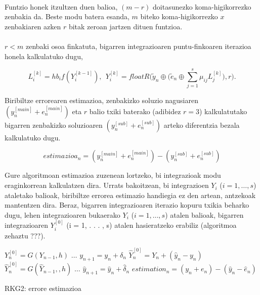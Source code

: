 \paragraph*{}Funtzio honek itzultzen duen balioa, $(m-r)$ doitasunezko koma-higikorrezko zenbakia da. Beste modu batera esanda, $m$ biteko koma-higikorrezko $x$ zenbakiaren azken $r$ bitak zeroan jartzen dituen funtzioa.
     
\paragraph*{} $r<m$ zenbaki osoa finkatuta, bigarren integrazioaren puntu-finkoaren iterazioa honela kalkulatuko dugu,

\begin{equation}
L_i^{[k]}=hb_if(Y_i^{[k-1]}), \ \ Y_i^{[k]}=floatR\bigg(\tilde{y}_n \oplus \big(\tilde{e}_n \oplus \sum\limits_{j=1}^{s} \mu_{ij} L_j^{[k]}\big),r\bigg).
\end{equation}

Biribiltze errorearen estimazioa, zenbakizko soluzio nagusiaren $(y^{[main]}_n+e^{[main]}_n)$ eta $r$ balio txiki baterako (adibidez $r=3$) kalkulatutako bigarren zenbakizko soluzioaren $(y^{[sub]}_n+e^{[sub]}_n)$ arteko diferentzia bezala kalkulatuko dugu.  

\begin{equation}
estimazioa_n=(y^{[main]}_n+e^{[main]}_n)-(y^{[sub]}_n+e^{[sub]}_n)
\end{equation}

Gure algoritmoan estimazioa zuzenean lortzeko, bi integrazioak modu eraginkorrean kalkulatzen dira. Urrats bakoitzean, bi integrazioen $Y_i$ ($i=1,\dots,s$) ataletako balioak, biribiltze errorea estimazio handiegia ez den artean,  antzekoak mantentzen dira. Beraz, bigarren integrazioaren iterazio kopuru txikia beharko dugu, lehen integrazioaren bukaerako $Y_i$ ($i=1,\dots,s$) atalen balioak, bigarren integrazioaren $Y_i^{[0]}$ (i = 1, . . . , s) atalen hasieratzeko erabiliz (algoritmoa zehaztu ???).  


\begin{algorithm}[h]
  \BlankLine
  {
    \BlankLine
    $Y_n^{[0]}=G(Y_{n-1},h)$\;
    $\dots$\;
    $y_{n+1}=y_{n}+\delta_n$\;
    \BlankLine
    \BlankLine
    {$\hat{Y}_{n}^{[0]}=Y_{n}+(\hat{y}_n-y_n)$\;}
    {$\hat{Y}_{n}^{[0]}=G(\hat{Y}_{n-1},,h)$\;}
    $\dots$\;
    $\hat{y}_{n+1}=\hat{y}_{n}+\hat{\delta}_n$\;
    \BlankLine
    \BlankLine
    $estimation_n=(y_n+e_n)-(\hat{y}_n-\hat{e}_n)$\;
    \BlankLine
   }
 \caption{RKG2: errore estimazioa}
\end{algorithm}

